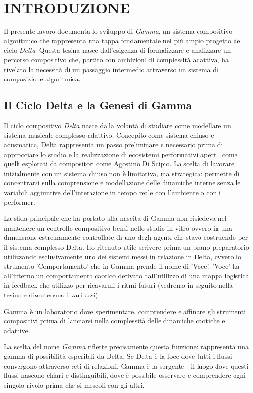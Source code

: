
\section{INTRODUZIONE}
Il presente lavoro documenta lo sviluppo di \textit{Gamma}, un sistema compositivo algoritmico che rappresenta una tappa fondamentale nel più ampio progetto del ciclo \textit{Delta}. Questa tesina nasce dall'esigenza di formalizzare e analizzare un percorso compositivo che, partito con ambizioni di complessità adattiva, ha rivelato la necessità di un passaggio intermedio attraverso un sistema di composizione algoritmica.
\subsection{Il Ciclo Delta e la Genesi di Gamma}
Il ciclo compositivo \textit{Delta} nasce dalla volontà di studiare come modellare un sistema musicale complesso adattivo. Concepito come sistema chiuso e acusmatico, Delta rappresenta un passo preliminare e necessario prima di approcciare lo studio e la realizzazione di ecosistemi performativi aperti, come quelli esplorati da compositori come Agostino Di Scipio. La scelta di lavorare inizialmente con un sistema chiuso non è limitativa, ma strategica: permette di concentrarsi sulla comprensione e modellazione delle dinamiche interne senza le variabili aggiuntive dell'interazione in tempo reale con l'ambiente o con i performer.

La sfida principale che ha portato alla nascita di Gamma non risiedeva nel mantenere un controllo compositivo bensì nello studio in vitro ovvero in una dimensione estremamente controllate di uno degli agenti che stavo costruendo per il sistema complesso Delta. Ho ritenuto utile scrivere prima un brano preparatorio utilizzando esclusivamente uno dei sistemi messi in relazione in Delta, ovvero lo strumento 'Comportamento' che in Gamma prende il nome di 'Voce'. 'Voce' ha all'interno un comportamento caotico derivato dall'utilizzo di una mappa logistica in feedback che utilizzo per ricavarmi i ritmi futuri (vedremo in seguito nella tesina e discuteremo i vari casi).

Gamma è un laboratorio dove sperimentare, comprendere e affinare gli strumenti compositivi prima di lanciarsi nella complessità delle dinamiche caotiche e adattive.

La scelta del nome \textit{Gamma} riflette precisamente questa funzione: rappresenta una gamma di possibilità esperibili da Delta. Se Delta è la foce dove tutti i flussi convergono attraverso reti di relazioni, Gamma è la sorgente - il luogo dove questi flussi nascono chiari e distinguibili, dove è possibile osservare e comprendere ogni singolo rivolo prima che si mescoli con gli altri.

